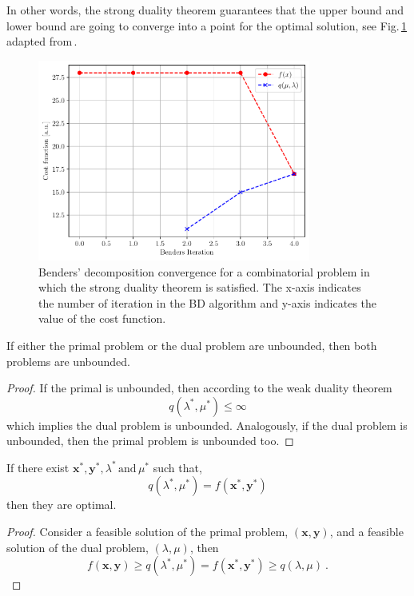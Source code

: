 In other words, the strong duality theorem guarantees that the upper bound and lower bound are going to converge into a point for the optimal solution, see Fig.\,\ref{fig:BD_Convergence} adapted from\,\cite{Zhao2021HybridProgramming}.
\begin{figure}[H]
\centering
\includegraphics[width=0.8\textwidth]{Figures/BD_Convergence.pdf} 
\caption{Benders' decomposition convergence for a combinatorial problem in which the strong duality theorem is satisfied. The x-axis indicates the number of iteration in the BD algorithm and y-axis indicates the value of the cost function.}
\label{fig:BD_Convergence}
\end{figure}
\begin{corollary}{}{}
If either the primal problem or the dual problem are unbounded, then both problems are unbounded.
\end{corollary}
\begin{proof}
If the primal is unbounded, then according to the weak duality theorem
\begin{equation}
    q(\lambda^{*}, \mu^{*}) \leq \infty
\end{equation}
which implies the dual problem is unbounded. Analogously, if the dual problem is unbounded, then the primal problem is unbounded too.
\end{proof}
\begin{corollary}{}{}
If there exist $\mathbf{x}^{*}, \mathbf{y}^{*},\lambda^{*}\,\textrm{and}\, \mu^{*}$ such that,
\begin{equation}
    q(\lambda^{*}, \mu^{*}) = f(\mathbf{x}^{*}, \mathbf{y}^{*})
\end{equation}
then they are optimal.
\end{corollary}
\begin{proof}
Consider a feasible solution of the primal problem, $(\mathbf{x}, \mathbf{y})$, and a feasible solution of the dual problem, $(\lambda, \mu)$, then
\begin{equation}
    f(\mathbf{x}, \mathbf{y}) \geq q(\lambda^{*}, \mu^{*}) = f(\mathbf{x}^{*}, \mathbf{y}^{*}) \geq q(\lambda, \mu)\ .
\end{equation}
\end{proof}
